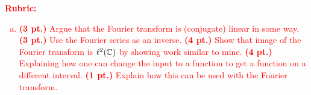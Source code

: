 \documentclass[12pt]{article} %
\begin{document}
\vspace*{1cm}
\textcolor{red}{
\noindent \textbf{Rubric:}
\begin{enumerate}[(a)]
    \item \textbf{(3 pt.)} Argue that the Fourier transform is (conjugate) linear in some way. \textbf{(3 pt.)} Use the Fourier series as an inverse. \textbf{(4 pt.)} Show that image of the Fourier transform is $\ell^2(\mathbb{C})$ by showing work similar to mine. \textbf{(4 pt.)} Explaining how one can change the input to a function to get a function on a different interval. \textbf{(1 pt.)} Explain how this can be used with the Fourier transform.
\end{enumerate}
}
\end{document}
